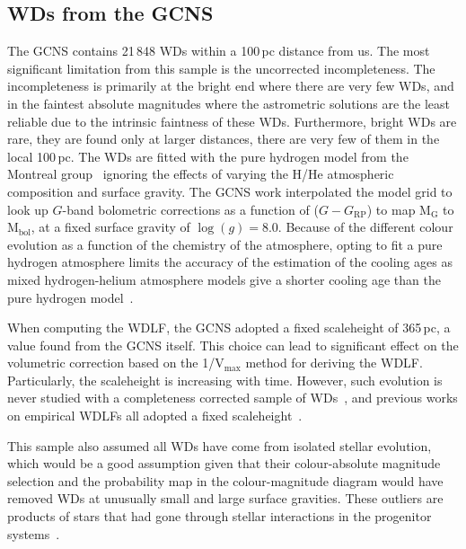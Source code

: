 \documentclass[fleqn,usenatbib]{mnras}
\begin{document}
\subsection{WDs from the GCNS}
The GCNS contains 21\,848 WDs within a 100\,pc distance from us. The most
significant limitation from this sample is the uncorrected incompleteness. The
incompleteness is primarily at the bright end where there are very few WDs, and
in the faintest absolute magnitudes where the astrometric solutions are the
least reliable due to the intrinsic faintness of these WDs. Furthermore, bright
WDs are rare, they are found only at larger distances, there are very few of
them in the local 100\,pc. The WDs are fitted with the pure hydrogen model from
the Montreal group~\citep{2019ApJ...876...67B} ignoring the effects of varying
the H/He atmospheric composition and surface gravity. The GCNS work
interpolated the model grid to look up $G$-band bolometric corrections as a
function of ($G - G_{\mathrm{RP}}$) to map M$_\mathrm{G}$ to M$_{\mathrm{bol}}$,
at a fixed surface gravity of $\log(g)=8.0$. Because of the different colour
evolution as a function of the chemistry of the atmosphere, opting to fit a
pure hydrogen atmosphere limits the accuracy of the estimation of the cooling
ages as mixed hydrogen-helium atmosphere models give a shorter cooling age than
the pure hydrogen model~\citep{2022ApJ...934...36B}. 

When computing the WDLF, the GCNS adopted a fixed scaleheight of 365\,pc, a
value found from the GCNS itself. This choice can lead to significant effect
on the volumetric correction based on the 1/V$_{\mathrm{max}}$ method for
deriving the WDLF. Particularly, the scaleheight is increasing with time.
However, such evolution is never studied with a completeness corrected sample
of WDs~\citep{2006AJ....131..571H}, and previous works on empirical WDLFs all
adopted a fixed scaleheight~\citep{2006AJ....131..571H, 2011MNRAS.417...93R,
2019MNRAS.482..715L}.

This sample also assumed all WDs have come from isolated stellar evolution,
which would be a good assumption given that their colour-absolute magnitude
selection and the probability map in the colour-magnitude diagram would have removed
WDs at unusually small and large surface gravities. These outliers are products
of stars that had gone through stellar interactions in the progenitor
systems~\citep[e.g.\ ][]{2013A&ARv..21...59I, 2023arXiv231117145H}.
\end{document}
